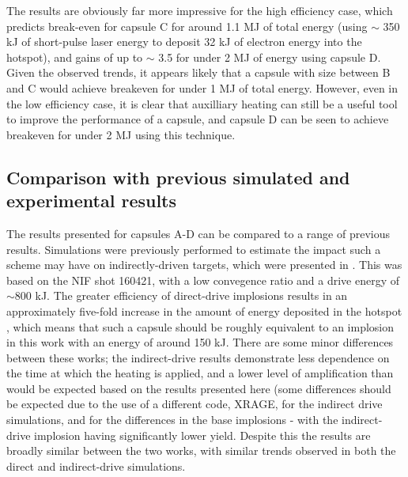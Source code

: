 The results are obviously far more impressive for the high efficiency case, which predicts break-even for capsule C for around 1.1 MJ of total energy (using $\sim$ 350 kJ of short-pulse laser energy to deposit 32 kJ of electron energy into the hotspot), and gains of up to $\sim$ 3.5 for under 2 MJ of energy using capsule D. Given the observed trends, it appears likely that a capsule with size between B and C would achieve breakeven for under 1 MJ of total energy. However, even in the low efficiency case, it is clear that auxilliary heating can still be a useful tool to improve the performance of a capsule, and capsule D can be seen to achieve breakeven for under 2 MJ using this technique.

\subsection{Comparison with previous simulated and experimental results}

The results presented for capsules A-D can be compared to a range of previous results. 
Simulations were previously performed to estimate the impact such a scheme may have on indirectly-driven targets, which were presented in \cite{Norreys2021}. This was based on the NIF shot 160421, with a low convegence ratio and a drive energy of $\sim 800$ kJ. The greater efficiency of direct-drive implosions results in an approximately five-fold increase in the amount of energy deposited in the hotspot \cite{Campbell2017, Goncharov2016}, which means that such a capsule should be roughly equivalent to an implosion in this work with an energy of around 150 kJ. There are some minor differences between these works; the indirect-drive results demonstrate less dependence on the time at which the heating is applied, and a lower level of amplification than would be expected based on the results presented here (some differences should be expected due to the use of a different code, XRAGE, for the indirect drive simulations, and for the differences in the base implosions - with the indirect-drive implosion having significantly lower yield. Despite this the results are broadly similar between the two works, with similar trends observed in both the direct and indirect-drive simulations.


